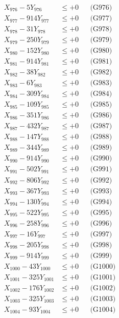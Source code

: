 \documentclass[a4paper,10pt]{article}
\begin{document}
{\begin{align}
X_{976} - 5Y_{976} &\leq +0 && \text{(G976)} \\
X_{977} - 914Y_{977} &\leq +0 && \text{(G977)} \\
X_{978} - 31Y_{978} &\leq +0 && \text{(G978)} \\
X_{979} - 250Y_{979} &\leq +0 && \text{(G979)} \\
X_{980} - 152Y_{980} &\leq +0 && \text{(G980)} \\
\allowbreak
X_{981} - 914Y_{981} &\leq +0 && \text{(G981)} \\
X_{982} - 38Y_{982} &\leq +0 && \text{(G982)} \\
X_{983} - 6Y_{983} &\leq +0 && \text{(G983)} \\
X_{984} - 309Y_{984} &\leq +0 && \text{(G984)} \\
X_{985} - 109Y_{985} &\leq +0 && \text{(G985)} \\
X_{986} - 351Y_{986} &\leq +0 && \text{(G986)} \\
X_{987} - 432Y_{987} &\leq +0 && \text{(G987)} \\
X_{988} - 147Y_{988} &\leq +0 && \text{(G988)} \\
X_{989} - 344Y_{989} &\leq +0 && \text{(G989)} \\
X_{990} - 914Y_{990} &\leq +0 && \text{(G990)} \\
\allowbreak
X_{991} - 502Y_{991} &\leq +0 && \text{(G991)} \\
X_{992} - 806Y_{992} &\leq +0 && \text{(G992)} \\
X_{993} - 367Y_{993} &\leq +0 && \text{(G993)} \\
X_{994} - 130Y_{994} &\leq +0 && \text{(G994)} \\
X_{995} - 522Y_{995} &\leq +0 && \text{(G995)} \\
X_{996} - 258Y_{996} &\leq +0 && \text{(G996)} \\
X_{997} - 16Y_{997} &\leq +0 && \text{(G997)} \\
X_{998} - 205Y_{998} &\leq +0 && \text{(G998)} \\
X_{999} - 914Y_{999} &\leq +0 && \text{(G999)} \\
X_{1000} - 43Y_{1000} &\leq +0 && \text{(G1000)} \\
\allowbreak
X_{1001} - 325Y_{1001} &\leq +0 && \text{(G1001)} \\
X_{1002} - 176Y_{1002} &\leq +0 && \text{(G1002)} \\
X_{1003} - 325Y_{1003} &\leq +0 && \text{(G1003)} \\
X_{1004} - 93Y_{1004} &\leq +0 && \text{(G1004)} \\

\end{align}}
\end{document}
